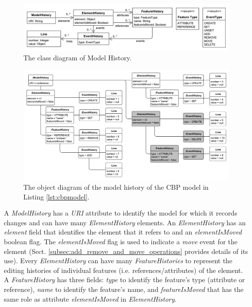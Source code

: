 \documentclass[12pt, a4paper]{report} \usepackage[titletoc]{appendix}
\begin{document}
\begin{figure}[ht]
	\centering
	\includegraphics[width=\linewidth]{object_history}
	\caption{The class diagram of Model History.}
	\label{fig:object_history}
\end{figure}

\begin{figure}[ht]
	\centering
	\includegraphics[width=\linewidth]{history_structure}
	\caption{The object diagram of the model history of the CBP model in Listing \ref{lst:cbpmodel}.}
	\label{fig:history_structure}
\end{figure}

A \emph{ModelHistory} has a \emph{URI} attribute to identify the model for which it records changes and can have many \emph{ElementHistory} elements. An \emph{ElementHistory} has an \emph{element} field that identifies the element that it refers to and an \emph{elementIsMoved} boolean flag. The  \emph{elementIsMoved} flag is used to indicate a \emph{move} event for the element (Sect. \ref{subsec:add_remove_and_move_operations} provides details of its use). Every \emph{ElementHistory} can have many \emph{FeatureHistories} to represent the editing histories of individual features (i.e. references/attributes) of the element.  A \emph{FeatureHistory} has three fields: \emph{type} to identify the feature's type (attribute or reference), \emph{name} to identify the feature's name, and \emph{featureIsMoved} that has the same role as attribute \emph{elementIsMoved} in \emph{ElementHistory}.
\end{document}
